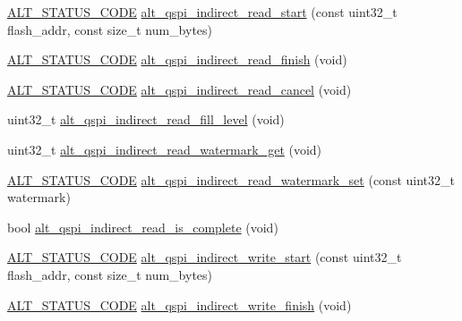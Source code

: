 \begin{DoxyCompactItemize}
\item 
\mbox{\hyperlink{hwlib_8h_abdb0d369f069723ca55d6c94bcaaaa12}{A\+L\+T\+\_\+\+S\+T\+A\+T\+U\+S\+\_\+\+C\+O\+DE}} \mbox{\hyperlink{group__ALT__QSPI__INDAC_ga1249afce923d78b6515d22b5190cf4ea}{alt\+\_\+qspi\+\_\+indirect\+\_\+read\+\_\+start}} (const uint32\+\_\+t flash\+\_\+addr, const size\+\_\+t num\+\_\+bytes)
\item 
\mbox{\hyperlink{hwlib_8h_abdb0d369f069723ca55d6c94bcaaaa12}{A\+L\+T\+\_\+\+S\+T\+A\+T\+U\+S\+\_\+\+C\+O\+DE}} \mbox{\hyperlink{group__ALT__QSPI__INDAC_gaa36b9eb2736eaaaecaf718b164857c7e}{alt\+\_\+qspi\+\_\+indirect\+\_\+read\+\_\+finish}} (void)
\item 
\mbox{\hyperlink{hwlib_8h_abdb0d369f069723ca55d6c94bcaaaa12}{A\+L\+T\+\_\+\+S\+T\+A\+T\+U\+S\+\_\+\+C\+O\+DE}} \mbox{\hyperlink{group__ALT__QSPI__INDAC_ga44da2573bde828e7d5f1675419df63e7}{alt\+\_\+qspi\+\_\+indirect\+\_\+read\+\_\+cancel}} (void)
\item 
uint32\+\_\+t \mbox{\hyperlink{group__ALT__QSPI__INDAC_gae7452ee77a72a893dbce80439107d0e2}{alt\+\_\+qspi\+\_\+indirect\+\_\+read\+\_\+fill\+\_\+level}} (void)
\item 
uint32\+\_\+t \mbox{\hyperlink{group__ALT__QSPI__INDAC_ga5c90fccba9d6aecc4a0f76f23a1d7910}{alt\+\_\+qspi\+\_\+indirect\+\_\+read\+\_\+watermark\+\_\+get}} (void)
\item 
\mbox{\hyperlink{hwlib_8h_abdb0d369f069723ca55d6c94bcaaaa12}{A\+L\+T\+\_\+\+S\+T\+A\+T\+U\+S\+\_\+\+C\+O\+DE}} \mbox{\hyperlink{group__ALT__QSPI__INDAC_gaad236d0859ac6a3eac9875be365b74c6}{alt\+\_\+qspi\+\_\+indirect\+\_\+read\+\_\+watermark\+\_\+set}} (const uint32\+\_\+t watermark)
\item 
bool \mbox{\hyperlink{group__ALT__QSPI__INDAC_ga7199629817c34345d00da8c5c09493f7}{alt\+\_\+qspi\+\_\+indirect\+\_\+read\+\_\+is\+\_\+complete}} (void)
\item 
\mbox{\hyperlink{hwlib_8h_abdb0d369f069723ca55d6c94bcaaaa12}{A\+L\+T\+\_\+\+S\+T\+A\+T\+U\+S\+\_\+\+C\+O\+DE}} \mbox{\hyperlink{group__ALT__QSPI__INDAC_ga3c9283ecedcc1d04f06654c2db8d7e0d}{alt\+\_\+qspi\+\_\+indirect\+\_\+write\+\_\+start}} (const uint32\+\_\+t flash\+\_\+addr, const size\+\_\+t num\+\_\+bytes)
\item 
\mbox{\hyperlink{hwlib_8h_abdb0d369f069723ca55d6c94bcaaaa12}{A\+L\+T\+\_\+\+S\+T\+A\+T\+U\+S\+\_\+\+C\+O\+DE}} \mbox{\hyperlink{group__ALT__QSPI__INDAC_ga8a1da95058c3fd260accfaa4bddd8e2c}{alt\+\_\+qspi\+\_\+indirect\+\_\+write\+\_\+finish}} (void)

\end{DoxyCompactItemize}
